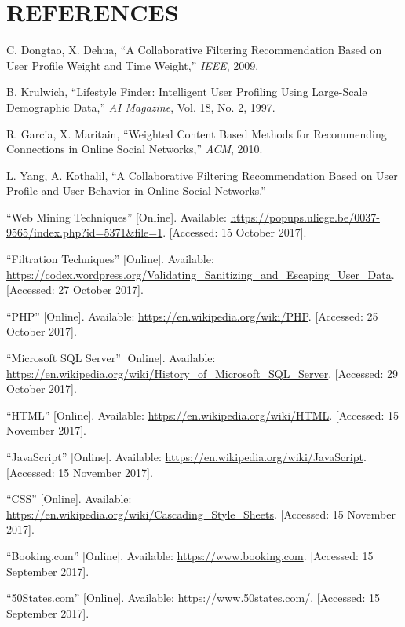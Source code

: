 \chapter*{REFERENCES}

\begin{enumerate}[label={[\arabic*]},leftmargin=*]

\item C. Dongtao, X. Dehua, ``A Collaborative Filtering Recommendation Based on User Profile Weight and Time Weight,'' \textit{IEEE}, 2009.

\item B. Krulwich, ``Lifestyle Finder: Intelligent User Profiling Using Large-Scale Demographic Data,'' \textit{AI Magazine}, Vol. 18, No. 2, 1997.

\item R. Garcia, X. Maritain, ``Weighted Content Based Methods for Recommending Connections in Online Social Networks,'' \textit{ACM}, 2010.

\item L. Yang, A. Kothalil, ``A Collaborative Filtering Recommendation Based on User Profile and User Behavior in Online Social Networks.''

\item ``Web Mining Techniques'' [Online]. Available: \url{https://popups.uliege.be/0037-9565/index.php?id=5371&file=1}. [Accessed: 15 October 2017].

\item ``Filtration Techniques'' [Online]. Available: \url{https://codex.wordpress.org/Validating_Sanitizing_and_Escaping_User_Data}. [Accessed: 27 October 2017].

\item ``PHP'' [Online]. Available: \url{https://en.wikipedia.org/wiki/PHP}. [Accessed: 25 October 2017].

\item ``Microsoft SQL Server'' [Online]. Available: \url{https://en.wikipedia.org/wiki/History_of_Microsoft_SQL_Server}. [Accessed: 29 October 2017].

\item ``HTML'' [Online]. Available: \url{https://en.wikipedia.org/wiki/HTML}. [Accessed: 15 November 2017].

\item ``JavaScript'' [Online]. Available: \url{https://en.wikipedia.org/wiki/JavaScript}. [Accessed: 15 November 2017].

\item ``CSS'' [Online]. Available: \url{https://en.wikipedia.org/wiki/Cascading_Style_Sheets}. [Accessed: 15 November 2017].

\item ``Booking.com'' [Online]. Available: \url{https://www.booking.com}. [Accessed: 15 September 2017].

\item ``50States.com'' [Online]. Available: \url{https://www.50states.com/}. [Accessed: 15 September 2017].

\end{enumerate}
